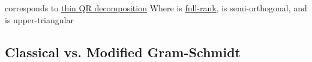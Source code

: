 \begin{itemize}
            \begin{itemize}

                  \vItem
                        corresponds to \ul{thin QR decomposition}
                  \vItem
                        Where  is \ul{full-rank},
                         is semi-orthogonal,
                        and  is upper-triangular
            \end{itemize}
\end{itemize}

\subsection*{Classical vs. Modified Gram-Schmidt}

